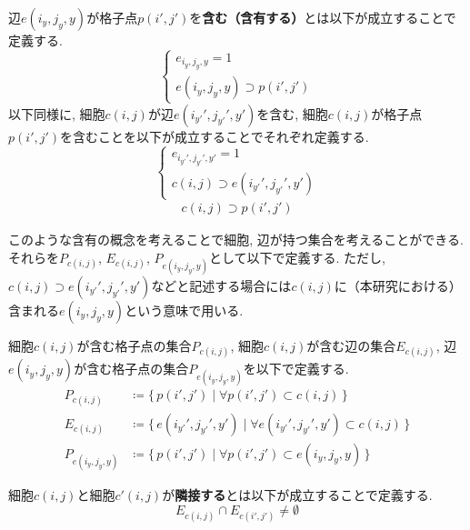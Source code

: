 \begin{definition}[含有]\label{definition:Contain}
  辺$e(i_y,j_y,y)$が格子点$p(i',j')$を\textbf{含む（含有する）}とは以下が成立することで定義する.
  \begin{equation}
    \begin{cases}
      {e_{i_y,j_y,y}=1               } \\
      {e(i_y,j_y,y)\supset p(i',j')}
    \end{cases}
  \end{equation}
  以下同様に, 細胞$c(i,j)$が辺$e(i_{y'}',j_{y'}',y')$を含む, 細胞$c(i,j)$が格子点$p(i',j')$を含むことを以下が成立することでそれぞれ定義する.
  \begin{equation}
    \begin{cases}
      {e_{i_{y'}',j_{y'}',y'}=1 } \\
      {c(i,j)\supset e(i_{y'}',j_{y'}',y')}
    \end{cases}
  \end{equation}
  \begin{align}
    c(i,j)\supset p(i',j')
  \end{align}
\end{definition}
このような含有の概念を考えることで細胞, 辺が持つ集合を考えることができる. それらを$P_{c(i,j)}$, $E_{c(i,j)}$, $P_{e(i_y,j_y,y)}$として以下で定義する. ただし, $c(i,j)\supset e(i_{y'}',j_{y'}',y')$などと記述する場合には$c(i,j)$に（本研究における）含まれる$e(i_y,j_y,y)$という意味で用いる.
\begin{definition}[$P_{c(i,j)}$, $E_{c(i,j)}$, $P_{e(i_y,j_y,y)}$]
  細胞$c(i,j)$が含む格子点の集合$P_{c(i,j)}$, 細胞$c(i,j)$が含む辺の集合$E_{c(i,j)}$, 辺$e(i_y,j_y,y)$が含む格子点の集合$P_{e(i_y,j_y,y)}$を以下で定義する.
  \begin{align}
    P_{c(i,j)}       & \coloneqq \{\,p(i',j') \mid \forall p(i',j') \subset c(i,j)\,\}                           \\
    E_{c(i,j)}       & \coloneqq \{\,e(i_{y'}',j_{y'}',y') \mid \forall e(i_{y'}',j_{y'}',y') \subset c(i,j)\,\} \\
    P_{e(i_y,j_y,y)} & \coloneqq \{\,p(i',j') \mid \forall p(i',j') \subset e(i_y,j_y,y)\,\}
  \end{align}
\end{definition}


\begin{definition}[隣接]\label{definition:Adjacent}
  細胞$c(i,j)$と細胞$c'(i,j)$が\textbf{隣接する}とは以下が成立することで定義する.
  \begin{equation}
    E_{c(i,j)} \cap E_{c(i',j')} \neq \emptyset
  \end{equation}
\end{definition}


